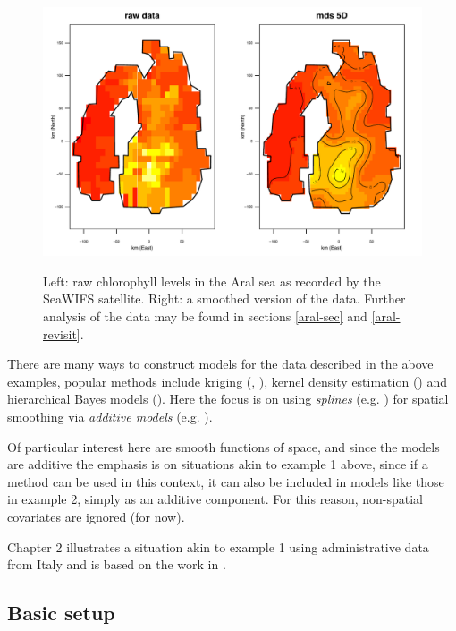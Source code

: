 \begin{figure}[tb]
\centering
\includegraphics[width=\textwidth]{mds/figs/aral-5d-duchon.pdf}\\
\caption{Left: raw chlorophyll levels in the Aral sea as recorded by the SeaWIFS satellite. Right: a smoothed version of the data. Further analysis of the data may be found in sections \ref{aral-sec} and \ref{aral-revisit}.}
\label{aral-intro}
\end{figure}

There are many ways to construct models for the data described in the above examples, popular methods include kriging (\cite{diggle},  \cite{schabenberger}), kernel density estimation (\cite{wandKDE}) and hierarchical Bayes models (\cite{banerjee}). Here the focus is on using \textit{splines} (e.g. \cite{wahba}) for spatial smoothing via \textit{additive models} (e.g. \cite{gammonograph}).

Of particular interest here are smooth functions of space, and since the models are additive the emphasis is on situations akin to example 1 above, since if a method can be used in this context, it can also be included in models like those in example 2, simply as an additive component. For this reason, non-spatial covariates are ignored (for now).

Chapter 2 illustrates a situation akin to example 1 using administrative data from Italy and is based on the work in .

\subsection{Basic setup}
\label{intro-basic-setup}

